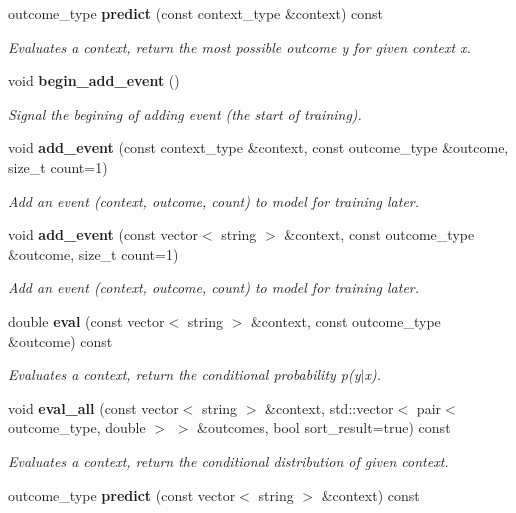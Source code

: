 \begin{CompactItemize}
outcome\_\-type {\bf predict} (const context\_\-type \&context) const
\begin{CompactList}\small\item\em Evaluates a context, return the most possible outcome y for given context x. \item\end{CompactList}\item 
void {\bf begin\_\-add\_\-event} ()
\begin{CompactList}\small\item\em Signal the begining of adding event (the start of training). \item\end{CompactList}\item 
void {\bf add\_\-event} (const context\_\-type \&context, const outcome\_\-type \&outcome, size\_\-t count=1)
\begin{CompactList}\small\item\em Add an event (context, outcome, count) to model for training later. \item\end{CompactList}\item 
void {\bf add\_\-event} (const vector$<$ string $>$ \&context, const outcome\_\-type \&outcome, size\_\-t count=1)
\begin{CompactList}\small\item\em Add an event (context, outcome, count) to model for training later. \item\end{CompactList}\item 
double {\bf eval} (const vector$<$ string $>$ \&context, const outcome\_\-type \&outcome) const
\begin{CompactList}\small\item\em Evaluates a context, return the conditional probability p(y$|$x). \item\end{CompactList}\item 
void {\bf eval\_\-all} (const vector$<$ string $>$ \&context, std::vector$<$ pair$<$ outcome\_\-type, double $>$ $>$ \&outcomes, bool sort\_\-result=true) const
\begin{CompactList}\small\item\em Evaluates a context, return the conditional distribution of given context. \item\end{CompactList}\item 
outcome\_\-type {\bf predict} (const vector$<$ string $>$ \&context) const

\end{CompactItemize}
